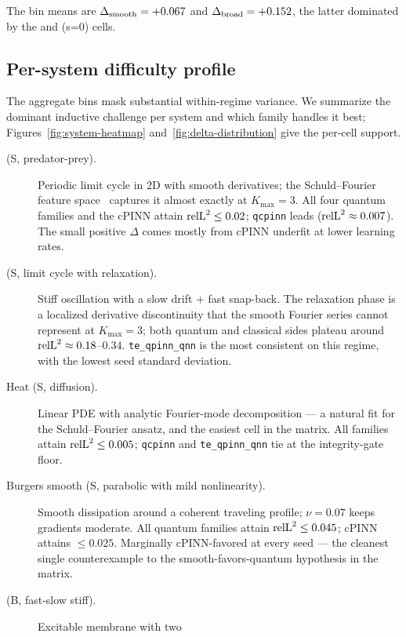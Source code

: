 The bin means are $\Delta_{\mathrm{smooth}} = +0.067$ and $\Delta_{\mathrm{broad}} = +0.152$, the
latter dominated by the \fhn{} and \ac{} (s=0) cells.

\subsection{Per-system difficulty profile}
\label{sec:per-system-profile}

The aggregate bins mask substantial within-regime variance. We
summarize the dominant inductive challenge per system and which family
handles it best; Figures~\ref{fig:system-heatmap}
and~\ref{fig:delta-distribution} give the per-cell support.

\begin{description}
  \item[\lv{} (S, predator-prey).] Periodic limit cycle in 2D with
        smooth derivatives; the Schuld--Fourier feature
        space~\cite{schuld2021effect} captures it almost exactly
        at $K_{\max} = 3$. All four quantum families and the cPINN
        attain $\mathrm{relL}^2 \le 0.02$; \texttt{qcpinn} leads
        ($\mathrm{relL}^2 \approx 0.007$). The small positive $\Delta$ comes
        mostly from cPINN underfit at lower learning rates.
  \item[\vdp{} (S, limit cycle with relaxation).] Stiff oscillation
        with a slow drift + fast snap-back. The relaxation phase is
        a localized derivative discontinuity that the smooth
        Fourier series cannot represent at $K_{\max} = 3$; both
        quantum and classical sides plateau around
        $\mathrm{relL}^2 \approx 0.18$--$0.34$. \texttt{te\_qpinn\_qnn}
        is the most consistent on this regime, with the lowest
        seed standard deviation.
  \item[Heat (S, diffusion).] Linear PDE with analytic Fourier-mode
        decomposition --- a natural fit for the Schuld--Fourier ansatz,
        and the easiest cell in the matrix. All families attain
        $\mathrm{relL}^2 \le 0.005$; \texttt{qcpinn} and \texttt{te\_qpinn\_qnn}
        tie at the integrity-gate floor.
  \item[Burgers smooth (S, parabolic with mild nonlinearity).]
        Smooth dissipation around a coherent traveling profile;
        $\nu = 0.07$ keeps gradients moderate. All quantum
        families attain $\mathrm{relL}^2 \le 0.045$; cPINN attains
        $\le 0.025$. Marginally cPINN-favored at every seed —
        the cleanest single counterexample to the
        smooth-favors-quantum hypothesis in the matrix.
  \item[\fhn{} (B, fast-slow stiff).] Excitable membrane with two

\end{description}
